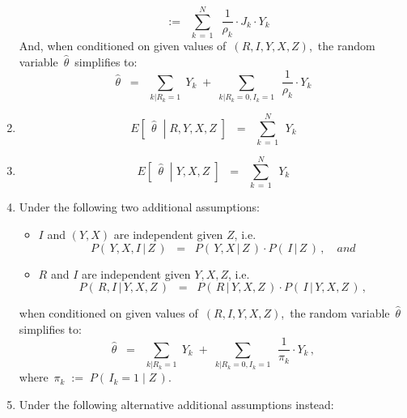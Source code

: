 \begin{proposition}
\begin{enumerate}
\begin{equation*}
	\,\;\; := \;\;
		\overset{N}{\underset{k\,=\,1}{\sum}}\;\;
		\dfrac{1}{\rho_{k}} \cdot J_{k} \cdot Y_{k}
	\end{equation*}
	And, when conditioned on given values of \,$(R,I,Y,X,Z)$,\,
	the random variable \,$\widehat{\theta}$\, simplifies to:
	\begin{equation*}
	\widehat{\theta}
	\;\; = \;\;
		\underset{k\vert R_{k}=1}{\sum}\; Y_{k}
		\; + \;
		\underset{k\vert R_{k}=0,I_{k}=1}{\sum}\;\, \dfrac{1}{\rho_{k}}\cdot Y_{k}
	\end{equation*}
\item
	\begin{equation*}
	E\!\left[\;\,\left.\widehat{\theta}\;\;\right\vert\;R,Y,X,Z\;\right]
	\;\; = \;\;
		\overset{N}{\underset{k\,=\,1}{\sum}}\;\, Y_{k}	
	\end{equation*}
\item
	\begin{equation*}
	E\!\left[\;\,\left.\widehat{\theta}\;\;\right\vert\;Y,X,Z\;\right]
	\;\; = \;\;
		\overset{N}{\underset{k\,=\,1}{\sum}}\;\, Y_{k}	
	\end{equation*}
\item
	Under the following two additional assumptions:
	\begin{itemize}
	\item
		$I$ and $(Y,X)$ are independent given $Z$, i.e.
		\begin{equation*}
		P\!\left(\,Y,X,I\,\vert\,Z\,\right)
		\;\; = \;\;
			P\!\left(\,Y,X\,\vert\,Z\,\right)
			\cdot
			P\!\left(\,I\,\vert\,Z\,\right)\,,
			\quad
			\textit{and}
		\end{equation*}
	\item
		$R$ and $I$ are independent given $Y,X,Z$, i.e.
		\begin{equation*}
		P\!\left(\,R,I\,\vert\,Y,X,Z\,\right)
		\;\; = \;\;
			P\!\left(\,R\,\vert\,Y,X,Z\,\right)
			\cdot
			P\!\left(\,I\,\vert\,Y,X,Z\,\right)\,,
		\end{equation*}	
	\end{itemize}
	when conditioned on given values of \,$(R,I,Y,X,Z)$,\, the random variable \,$\widehat{\theta}$\, simplifies to:
	\begin{equation*}
	\widehat{\theta}
	\;\; = \;\;
		\underset{k\vert R_{k}=1}{\sum}\; Y_{k}
		\; + \;
		\underset{k\vert R_{k}=0,I_{k}=1}{\sum}\;\, \dfrac{1}{\pi_{k}}\cdot Y_{k}\,,
	\end{equation*}
	where \,$\pi_{k} \; := \; P(\,I_{k}=1\;\vert\;Z\,)$.
\item
	Under the following alternative additional assumptions instead:

\end{enumerate}
\end{proposition}
